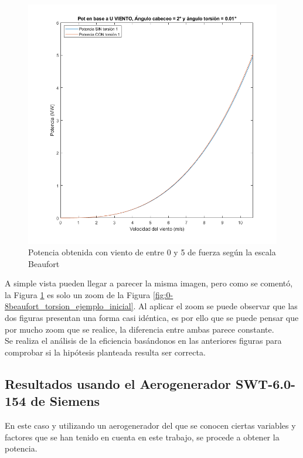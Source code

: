 \begin{figure}[H]
    \centering
    \includegraphics[width=1\textwidth]{images/0-5beau torsion.png}
    \caption{Potencia obtenida con viento de entre 0 y 5 de fuerza según la escala Beaufort}
     \label{fig:0-5beaufort_torsion_ejemplo_inicial}
\end{figure}

A simple vista pueden llegar a parecer la misma imagen, pero como se comentó, la Figura \ref{fig:0-5beaufort_torsion_ejemplo_inicial} es solo un zoom de la Figura \ref{fig:0-8beaufort_torsion_ejemplo_inicial}. Al aplicar el zoom se puede observar que las dos figuras presentan una forma casi idéntica, es por ello que se puede pensar que por mucho zoom que se realice, la diferencia entre ambas parece constante.\\

Se realiza el análisis de la eficiencia basándonos en las anteriores figuras para comprobar si la hipótesis planteada resulta ser correcta.\\

\subsection{Resultados usando el Aerogenerador SWT-6.0-154\cite{Siemens2022} de Siemens}

En este caso y utilizando un aerogenerador del que se conocen ciertas variables y factores que se han tenido en cuenta en este trabajo, se procede a obtener la potencia.\\

